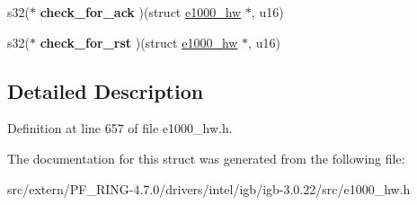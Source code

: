\begin{DoxyCompactItemize}
\item 
\hypertarget{structe1000__mbx__operations_a3b988ca876dbe0d2edf6490f3adfda2c}{
s32($\ast$ {\bfseries check\_\-for\_\-ack} )(struct \hyperlink{structe1000__hw}{e1000\_\-hw} $\ast$, u16)}
\label{structe1000__mbx__operations_a3b988ca876dbe0d2edf6490f3adfda2c}

\item 
\hypertarget{structe1000__mbx__operations_a650359cd1c4eb44929c144587a2de6be}{
s32($\ast$ {\bfseries check\_\-for\_\-rst} )(struct \hyperlink{structe1000__hw}{e1000\_\-hw} $\ast$, u16)}
\label{structe1000__mbx__operations_a650359cd1c4eb44929c144587a2de6be}

\end{DoxyCompactItemize}


\subsection{Detailed Description}


Definition at line 657 of file e1000\_\-hw.h.



The documentation for this struct was generated from the following file:\begin{DoxyCompactItemize}
\item 
src/extern/PF\_\-RING-\/4.7.0/drivers/intel/igb/igb-\/3.0.22/src/e1000\_\-hw.h\end{DoxyCompactItemize}
